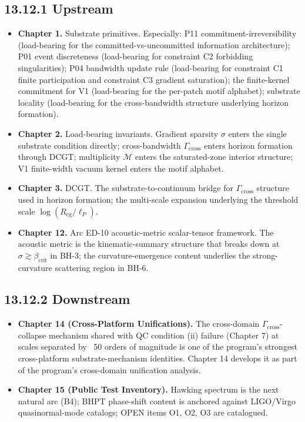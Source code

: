 \documentclass[11pt]{book}
\begin{document}
\subsection{13.12.1 Upstream}

\begin{itemize}
\item \textbf{Chapter 1.} Substrate primitives. Especially: P11 commitment-irreversibility (load-bearing for the committed-vs-uncommitted information architecture); P01 event discreteness (load-bearing for constraint C2 forbidding singularities); P04 bandwidth update rule (load-bearing for constraint C1 finite participation and constraint C3 gradient saturation); the finite-kernel commitment for V1 (load-bearing for the per-patch motif alphabet); substrate locality (load-bearing for the cross-bandwidth structure underlying horizon formation).
\item \textbf{Chapter 2.} Load-bearing invariants. Gradient sparsity $\sigma$ enters the single substrate condition directly; cross-bandwidth $\Gamma_\mathrm{cross}$ enters horizon formation through DCGT; multiplicity $\mathcal{M}$ enters the saturated-zone interior structure; V1 finite-width vacuum kernel enters the motif alphabet.
\item \textbf{Chapter 3.} DCGT. The substrate-to-continuum bridge for $\Gamma_\mathrm{cross}$ structure used in horizon formation; the multi-scale expansion underlying the threshold scale $\log(R_\mathrm{cg}/\ell_P)$.
\item \textbf{Chapter 12.} Arc ED-10 acoustic-metric scalar-tensor framework. The acoustic metric is the kinematic-summary structure that breaks down at $\sigma \gtrsim \beta_\mathrm{crit}$ in BH-3; the curvature-emergence content underlies the strong-curvature scattering region in BH-6.
\end{itemize}

\subsection{13.12.2 Downstream}

\begin{itemize}
\item \textbf{Chapter 14 (Cross-Platform Unifications).} The cross-domain $\Gamma_\mathrm{cross}$-collapse mechanism shared with QC condition (ii) failure (Chapter 7) at scales separated by ~50 orders of magnitude is one of the program's strongest cross-platform substrate-mechanism identities. Chapter 14 develops it as part of the program's cross-domain unification analysis.
\item \textbf{Chapter 15 (Public Test Inventory).} Hawking spectrum is the next natural arc (B4); BHPT phase-shift content is anchored against LIGO/Virgo quasinormal-mode catalogs; OPEN items O1, O2, O3 are catalogued.
\end{itemize}
\end{document}
